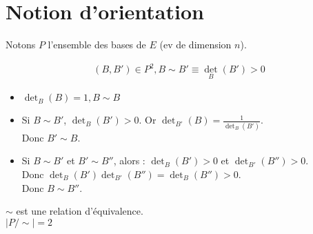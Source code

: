 \documentclass[../main.tex]{subfiles}
\begin{document}
\section*{Notion d'orientation}
\noindent Notons $P$ l'ensemble des bases de $E$ (ev de dimension $n$).

\begin{tcolorbox}[title=Définition, title filled=false, colframe=lightpurple, colback=lightpurple!10!white]
    \begin{align*}
        (B, B') \in P^2, B\sim B' \equiv \operatorname{det}_{B}(B') > 0
    \end{align*}
\end{tcolorbox}

\begin{itemize}
    \item $\operatorname{det}_{B}(B) = 1, B\sim B$
    \item Si $B\sim B'$, $\operatorname{det}_{B}(B') > 0$. 
    Or $\operatorname{det}_{B'}(B) = \frac{1}{\operatorname{det}_{B}(B')}$. \\
    Donc $B'\sim B$. 
    \item Si $B\sim B'$ et $B'\sim B''$, alors :
    $\operatorname{det}_{B}(B') > 0$ et $\operatorname{det}_{B'}(B'') > 0$. \\
    Donc $\operatorname{det}_{B}(B') \operatorname{det}_{B'}(B'') = \operatorname{det}_B(B'') > 0$. \\
    Donc $B\sim B''$. 
\end{itemize}
$\sim$ est une relation d'équivalence. \\
$\boxed{|P\slash\sim| = 2}$ 
\begin{center}
\end{center}
\end{document}
